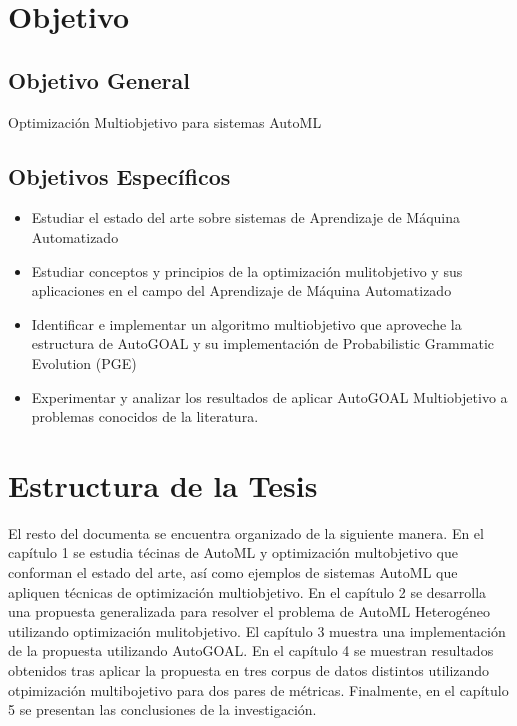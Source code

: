  
\section*{Objetivo}
\subsection*{Objetivo General}
Optimizaci\'on Multiobjetivo para sistemas AutoML
\subsection*{Objetivos Espec\'ificos}
\begin{itemize}
    \item Estudiar el estado del arte sobre sistemas de Aprendizaje de M\'aquina Automatizado
    \item Estudiar conceptos y principios de la optimizaci\'on mulitobjetivo y sus aplicaciones en el campo del Aprendizaje de M\'aquina Automatizado
    \item Identificar e implementar un algoritmo multiobjetivo que aproveche la estructura de AutoGOAL y su implementaci\'on de Probabilistic Grammatic Evolution (PGE)
    \item Experimentar y analizar los resultados de aplicar AutoGOAL Multiobjetivo a problemas conocidos de la literatura.
\end{itemize}

\section*{Estructura de la Tesis}
El resto del documenta se encuentra organizado de la siguiente manera. En el cap\'itulo 1 se estudia t\'ecinas de AutoML y optimizaci\'on multobjetivo que conforman el estado del arte, as\'i como ejemplos de sistemas AutoML que apliquen t\'ecnicas de optimizaci\'on multiobjetivo. En el cap\'itulo 2 se desarrolla una propuesta generalizada para resolver el problema de AutoML Heterog\'eneo utilizando optimizaci\'on mulitobjetivo. El cap\'itulo 3 muestra una implementaci\'on de la propuesta utilizando AutoGOAL. En el cap\'itulo 4 se muestran resultados obtenidos tras aplicar la propuesta en tres corpus de datos distintos utilizando otpimizaci\'on multibojetivo para dos pares de m\'etricas. Finalmente, en el cap\'itulo 5 se presentan las conclusiones de la investigaci\'on.
